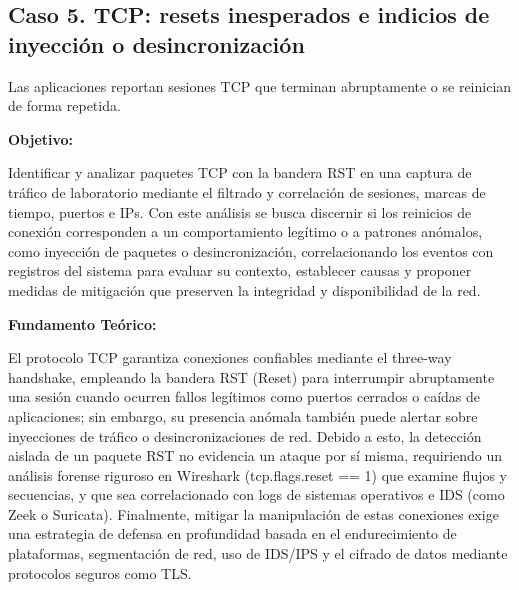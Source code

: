 \subsection{Caso 5. TCP: resets inesperados e indicios de inyección o desincronización}
\label{caso:tcp-resets}

\begin{situacion}
Las aplicaciones reportan sesiones TCP que terminan abruptamente o se reinician de forma repetida.

\textbf{Objetivo:} \par
Identificar y analizar paquetes TCP con la bandera RST en una captura de tráfico de laboratorio mediante el filtrado y correlación de sesiones, marcas de tiempo, puertos e IPs. Con este análisis se busca discernir si los reinicios de conexión corresponden a un comportamiento legítimo o a patrones anómalos, como inyección de paquetes o desincronización, correlacionando los eventos con registros del sistema para evaluar su contexto, establecer causas y proponer medidas de mitigación que preserven la integridad y disponibilidad de la red.

\textbf{Fundamento Teórico:} \par
El protocolo TCP garantiza conexiones confiables mediante el three-way handshake, empleando la bandera RST (Reset) para interrumpir abruptamente una sesión cuando ocurren fallos legítimos como puertos cerrados o caídas de aplicaciones; sin embargo, su presencia anómala también puede alertar sobre inyecciones de tráfico o desincronizaciones de red. Debido a esto, la detección aislada de un paquete RST no evidencia un ataque por sí misma, requiriendo un análisis forense riguroso en Wireshark (tcp.flags.reset == 1) que examine flujos y secuencias, y que sea correlacionado con logs de sistemas operativos e IDS (como Zeek o Suricata). Finalmente, mitigar la manipulación de estas conexiones exige una estrategia de defensa en profundidad basada en el endurecimiento de plataformas, segmentación de red, uso de IDS/IPS y el cifrado de datos mediante protocolos seguros como TLS.
\end{situacion}

